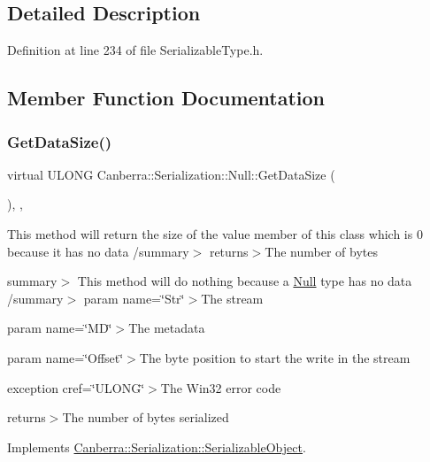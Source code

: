 \subsection{Detailed Description}


Definition at line 234 of file Serializable\+Type.\+h.



\subsection{Member Function Documentation}
\mbox{\label{class_canberra_1_1_serialization_1_1_null_ac1e04c89451e4e7aabdf791715218c6e_ac1e04c89451e4e7aabdf791715218c6e}} 
\subsubsection{\texorpdfstring{Get\+Data\+Size()}{GetDataSize()}}
{\footnotesize\ttfamily virtual U\+L\+O\+NG Canberra\+::\+Serialization\+::\+Null\+::\+Get\+Data\+Size (\begin{DoxyParamCaption}{ }\end{DoxyParamCaption})\hspace{0.3cm}{\ttfamily [inline]}, {\ttfamily [protected]}, {\ttfamily [virtual]}}



This method will return the size of the value member of this class which is 0 because it has no data /summary$>$ returns$>$The number of bytes

summary$>$ This method will do nothing because a \hyperlink{class_canberra_1_1_serialization_1_1_null}{Null} type has no data /summary$>$ param name=\char`\"{}\+Str\char`\"{}$>$The stream

param name=\char`\"{}\+M\+D\char`\"{}$>$The metadata

param name=\char`\"{}\+Offset\char`\"{}$>$The byte position to start the write in the stream

exception cref=\char`\"{}\+U\+L\+O\+N\+G\char`\"{}$>$The Win32 error code

returns$>$The number of bytes serialized

Implements \hyperlink{class_canberra_1_1_serialization_1_1_serializable_object}{Canberra\+::\+Serialization\+::\+Serializable\+Object}.




